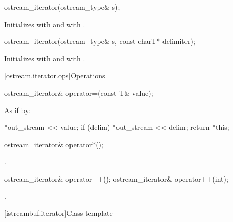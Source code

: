 %
\begin{itemdecl}
ostream_iterator(ostream_type& s);
\end{itemdecl}

\begin{itemdescr}
\pnum
\effects
Initializes  with  and
 with .
\end{itemdescr}


%
\begin{itemdecl}
ostream_iterator(ostream_type& s, const charT* delimiter);
\end{itemdecl}

\begin{itemdescr}
\pnum
\effects
Initializes  with  and
 with .
\end{itemdescr}

[ostream.iterator.ops]{Operations}

%
\begin{itemdecl}
ostream_iterator& operator=(const T& value);
\end{itemdecl}

\begin{itemdescr}
\pnum
\effects
As if by:
\begin{codeblock}
*out_stream << value;
if (delim)
  *out_stream << delim;
return *this;
\end{codeblock}
\end{itemdescr}

%
\begin{itemdecl}
ostream_iterator& operator*();
\end{itemdecl}

\begin{itemdescr}
\pnum
\returns
{}.
\end{itemdescr}

%
\begin{itemdecl}
ostream_iterator& operator++();
ostream_iterator& operator++(int);
\end{itemdecl}

\begin{itemdescr}
\pnum
\returns
{}.
\end{itemdescr}

[istreambuf.iterator]{Class template }

